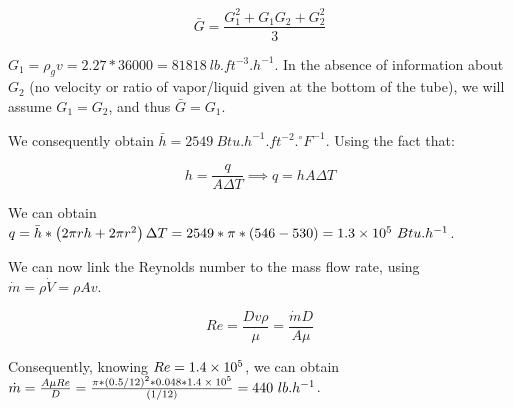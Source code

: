 \begin{equation}
\bar{G} = \frac{G_1^2 + G_1G_2 + G_2^2}{3}
\end{equation}

$G_1 = \rho_g v = 2.27 * 36000 = 81818\ lb.ft^{-3}.h^{-1}$. In the absence of information about $G_2$ (no velocity or ratio of vapor/liquid given at the bottom of the tube), we will assume $G_1 = G_2$, and thus $\bar{G} = G_1$. 

We consequently obtain $\bar{h} = 2549\ Btu.h^{-1}.ft^{-2}.{}^\circ F^{-1}$. Using the fact that:

\begin{equation}
h = \frac{q}{A\Delta T} \implies q = hA\Delta T
\end{equation}

We can obtain $q = \bar{h} * \left( 2\pi r h + 2 \pi r^2 \right) \Delta T = 2549 * \pi * (546 - 530) = \text{\num{1.3e5}}\ Btu.h^{-1}$.

We can now link the Reynolds number to the mass flow rate, using $\dot{m} = \rho\dot{V}=\rho A v$.

\begin{equation}
Re = \frac{Dv\rho}{\mu} = \frac{\dot{m} D}{A\mu}
\end{equation}

Consequently, knowing $Re = \text{\num{1.4e5}}$, we can obtain $\dot{m} = \frac{A \mu Re}{D} = \frac{\pi * (0.5/12)^2 * 0.048 * \text{\num{1.4e5}}}{(1/12)} = 440\ lb.h^{-1}$.

